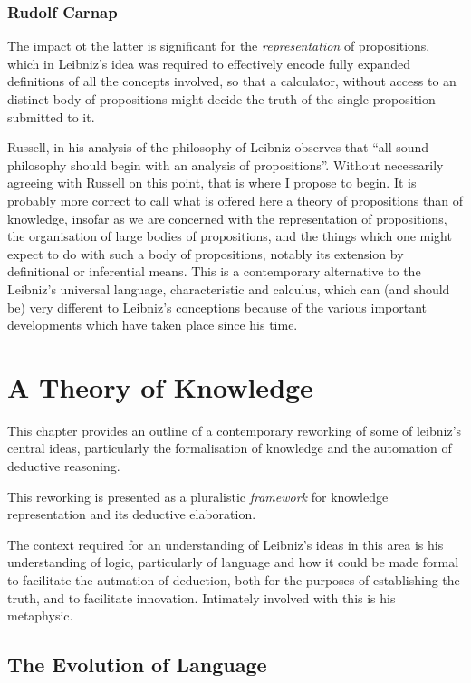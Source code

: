 \subsection{Rudolf Carnap}

The impact ot the latter is significant for the \emph{representation} of propositions, which in Leibniz's idea was required to effectively encode fully expanded definitions of all the concepts involved, so that a calculator, without access to an distinct body of propositions might decide the truth of the single proposition submitted to it.

Russell, in his analysis of the philosophy of Leibniz observes that ``all sound philosophy should begin with an analysis of propositions''.
Without necessarily agreeing with Russell on this point, that is where I propose to begin.
It is probably more correct to call what is offered here a theory of propositions than of knowledge,
insofar as we are concerned with the representation of propositions, the organisation of large bodies of
propositions, and the things which one might expect to do with such a body of propositions, notably
its extension by definitional or inferential means.
This is a contemporary alternative to the Leibniz's universal language, characteristic and calculus,
which can (and should be) very different to Leibniz's conceptions because of the various important
developments which have taken place since his time.



\chapter{A Theory of Knowledge}\label{TheoryOfKnowledge}

This chapter provides an outline of a contemporary reworking of some of leibniz's central
ideas, particularly the formalisation of knowledge and the automation of deductive reasoning.

This reworking is presented as a pluralistic \emph{framework} for knowledge representation and its
deductive elaboration.

The context required for an understanding of Leibniz's ideas in this area is his
understanding of logic, particularly of language and how it could be made formal
to facilitate the autmation of deduction, both for the purposes of establishing
the truth, and to facilitate innovation.
Intimately involved with this is his metaphysic.

\section{The Evolution of Language}
